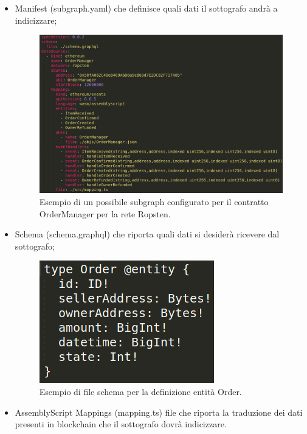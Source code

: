 \begin{itemize}
 \item Manifest (subgraph.yaml) che definisce quali dati il sottografo andrà a indicizzare;

 \begin{figure}[H]
    \centering
    \includegraphics[scale=0.3]{immagini/subgraf.png}
    \caption{Esempio di un possibile subgraph configurato per il contratto OrderManager per la rete Ropsten.}
 \end{figure}


 \item Schema (schema.graphql) che riporta quali dati si desiderà ricevere dal sottografo;

 \begin{figure}[H]
    \centering
    \includegraphics[scale=0.4]{immagini/schema.png}
    \caption{Esempio di file schema per la definizione entità Order.}
 \end{figure}

 \item AssemblyScript Mappings (mapping.ts) file che riporta la traduzione dei dati presenti in blockchain che il sottografo dovrà indicizzare.


\end{itemize}
